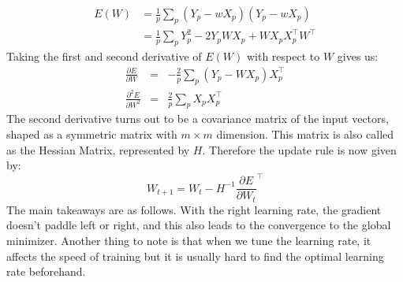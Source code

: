 \begin{align*}
E(W) &=\frac{1}{p}\sum_{p}(Y_{p} - wX_{p})(Y_{p} - wX_{p})\\
&= \frac{1}{p}\sum_{p}Y_{p}^2 - 2Y_{p}WX_{p} + WX_{p} X_p^{\top}W^\top
\end{align*}
Taking the first and second derivative of $E(W)$ with respect to $W$ gives us:
\begin{eqnarray*}
\frac{\partial E}{\partial W} &=& -\frac{2}{p}\sum_{p}(Y_{p} - WX_{p}) X_{p}^\top\\
\frac{\partial^2 E}{\partial W^2} &=&  \frac{2}{p}\sum_{p}X_{p}X_{p}^\top
\end{eqnarray*}
The second derivative turns out to be a covariance matrix of the input vectors, shaped as a symmetric matrix with $m \times m$ dimension. This matrix is also called as the Hessian Matrix, represented by $H$. Therefore the update rule is now given by:
$$ W_{t+1} = W_t - H^{-1}\frac{\partial E}{\partial W_t}^{\top} $$
The main takeaways are as follows. With the right learning rate, the gradient doesn't paddle left or right, and this also leads to the convergence to the global minimizer. Another thing to note is that when we tune the learning rate, it affects the speed of training but it is usually hard to find the optimal learning rate beforehand.
